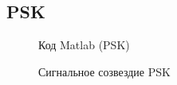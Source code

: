 \documentclass[12pt,a4paper]{scrartcl}
\begin{document}
\clearpage
\newpage

\subsection{PSK}
\label{sec:PSK}
\begin{figure}[h!]
\caption{Код Matlab (PSK)}
\end{figure}

\begin{figure}[h!]
\caption{Сигнальное созвездие PSK}
\end{figure}

\clearpage
\newpage
\end{document}
